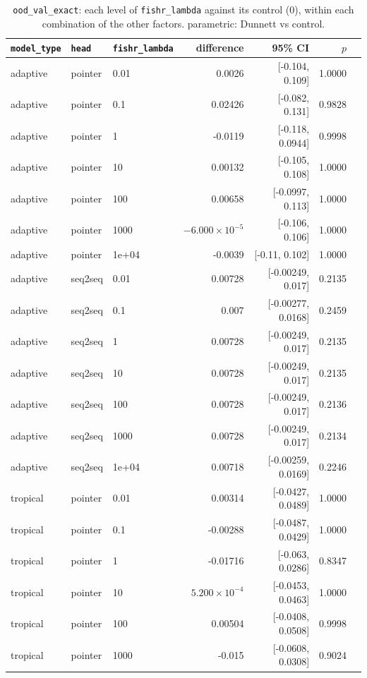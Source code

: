 \documentclass[10pt]{article}
\begin{document}
{\small
\begin{longtable}{lllrrrl}
\caption{\texttt{ood\_val\_exact}: each level of \texttt{fishr\_lambda} against its control (0), within each combination of the other factors. parametric: Dunnett vs control.}\label{tab:control-ood_val_exact}\\
\toprule
\texttt{model\_type} & \texttt{head} & \texttt{fishr\_lambda} & difference & 95\% CI & $p$ & \\
\midrule
\endhead
adaptive & pointer & 0.01 & 0.0026 & [-0.104, 0.109] & 1.0000 & \\
adaptive & pointer & 0.1 & 0.02426 & [-0.082, 0.131] & 0.9828 & \\
adaptive & pointer & 1 & -0.0119 & [-0.118, 0.0944] & 0.9998 & \\
adaptive & pointer & 10 & 0.00132 & [-0.105, 0.108] & 1.0000 & \\
adaptive & pointer & 100 & 0.00658 & [-0.0997, 0.113] & 1.0000 & \\
adaptive & pointer & 1000 & $-6.000\times10^{-5}$ & [-0.106, 0.106] & 1.0000 & \\
adaptive & pointer & 1e+04 & -0.0039 & [-0.11, 0.102] & 1.0000 & \\
adaptive & seq2seq & 0.01 & 0.00728 & [-0.00249, 0.017] & 0.2135 & \\
adaptive & seq2seq & 0.1 & 0.007 & [-0.00277, 0.0168] & 0.2459 & \\
adaptive & seq2seq & 1 & 0.00728 & [-0.00249, 0.017] & 0.2135 & \\
adaptive & seq2seq & 10 & 0.00728 & [-0.00249, 0.017] & 0.2135 & \\
adaptive & seq2seq & 100 & 0.00728 & [-0.00249, 0.017] & 0.2136 & \\
adaptive & seq2seq & 1000 & 0.00728 & [-0.00249, 0.017] & 0.2134 & \\
adaptive & seq2seq & 1e+04 & 0.00718 & [-0.00259, 0.0169] & 0.2246 & \\
tropical & pointer & 0.01 & 0.00314 & [-0.0427, 0.0489] & 1.0000 & \\
tropical & pointer & 0.1 & -0.00288 & [-0.0487, 0.0429] & 1.0000 & \\
tropical & pointer & 1 & -0.01716 & [-0.063, 0.0286] & 0.8347 & \\
tropical & pointer & 10 & $5.200\times10^{-4}$ & [-0.0453, 0.0463] & 1.0000 & \\
tropical & pointer & 100 & 0.00504 & [-0.0408, 0.0508] & 0.9998 & \\
tropical & pointer & 1000 & -0.015 & [-0.0608, 0.0308] & 0.9024 & \\

\end{longtable}}
\end{document}

